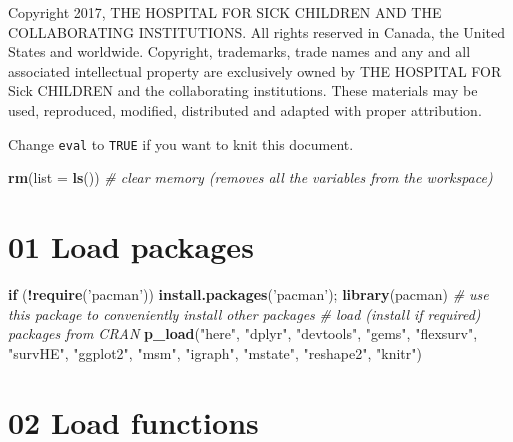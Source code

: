 \documentclass[
]{article}
\newenvironment{Shaded}{\begin{snugshade}}{\end{snugshade}}
\newcommand{\CommentTok}[1]{\textcolor[rgb]{0.56,0.35,0.01}{\textit{#1}}}
\newcommand{\ControlFlowTok}[1]{\textcolor[rgb]{0.13,0.29,0.53}{\textbf{#1}}}
\newcommand{\DataTypeTok}[1]{\textcolor[rgb]{0.13,0.29,0.53}{#1}}
\newcommand{\KeywordTok}[1]{\textcolor[rgb]{0.13,0.29,0.53}{\textbf{#1}}}
\newcommand{\NormalTok}[1]{#1}
\newcommand{\OperatorTok}[1]{\textcolor[rgb]{0.81,0.36,0.00}{\textbf{#1}}}
\newcommand{\StringTok}[1]{\textcolor[rgb]{0.31,0.60,0.02}{#1}}
\begin{document}
Copyright 2017, THE HOSPITAL FOR SICK CHILDREN AND THE COLLABORATING
INSTITUTIONS. All rights reserved in Canada, the United States and
worldwide. Copyright, trademarks, trade names and any and all associated
intellectual property are exclusively owned by THE HOSPITAL FOR Sick
CHILDREN and the collaborating institutions. These materials may be
used, reproduced, modified, distributed and adapted with proper
attribution.

\newpage

Change \texttt{eval} to \texttt{TRUE} if you want to knit this document.

\begin{Shaded}
\begin{Highlighting}[]
\KeywordTok{rm}\NormalTok{(}\DataTypeTok{list =} \KeywordTok{ls}\NormalTok{())      }\CommentTok{# clear memory (removes all the variables from the workspace)}
\end{Highlighting}
\end{Shaded}

\hypertarget{load-packages}{%
\section{01 Load packages}\label{load-packages}}

\begin{Shaded}
\begin{Highlighting}[]
\ControlFlowTok{if}\NormalTok{ (}\OperatorTok{!}\KeywordTok{require}\NormalTok{(}\StringTok{'pacman'}\NormalTok{)) }\KeywordTok{install.packages}\NormalTok{(}\StringTok{'pacman'}\NormalTok{); }\KeywordTok{library}\NormalTok{(pacman) }\CommentTok{# use this package to conveniently install other packages}
\CommentTok{# load (install if required) packages from CRAN}
\KeywordTok{p_load}\NormalTok{(}\StringTok{"here"}\NormalTok{, }\StringTok{"dplyr"}\NormalTok{, }\StringTok{"devtools"}\NormalTok{, }\StringTok{"gems"}\NormalTok{, }\StringTok{"flexsurv"}\NormalTok{, }\StringTok{"survHE"}\NormalTok{, }\StringTok{"ggplot2"}\NormalTok{, }\StringTok{"msm"}\NormalTok{, }\StringTok{"igraph"}\NormalTok{, }\StringTok{"mstate"}\NormalTok{,}
        \StringTok{"reshape2"}\NormalTok{, }\StringTok{"knitr"}\NormalTok{)   }
\end{Highlighting}
\end{Shaded}

\hypertarget{load-functions}{%
\section{02 Load functions}\label{load-functions}}
\end{document}
